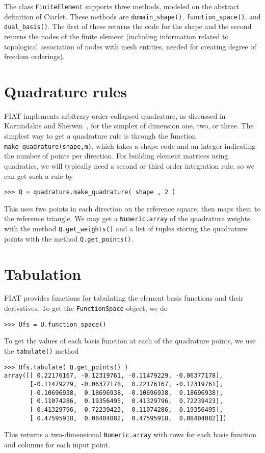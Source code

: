 \documentclass{fenicsmanual}
\begin{document}
The class \verb.FiniteElement. supports three methods, modeled on the
abstract definition of Ciarlet.  These methods are
\verb.domain_shape()., \verb.function_space()., and \verb.dual_basis()..
The first of these returns the code for the shape and the second
returns the nodes of the finite element (including information related
to topological association of nodes with mesh entities, needed for
creating degree of freedom orderings).  

\section{Quadrature rules}
FIAT implements arbitrary-order collapsed quadrature, as discussed in
Karniadakis and Sherwin~\cite{}, for the simplex of dimension one,
two, or three.  The simplest way to get a quadrature rule is through
the function \verb.make_quadrature(shape,m)., which takes a shape code
and an integer indicating the number of points per direction.  For
building element matrices using quadratics, we will typically need a
second or third order integration rule, so we can get such a rule by
\begin{verbatim}
>>> Q = quadrature.make_quadrature( shape , 2 )
\end{verbatim}
This uses two points in each direction on the reference square, then
maps them to the reference triangle.  We may get a
\verb/Numeric.array/ of the quadrature weights with the method
\verb/Q.get_weights()/ and a list of tuples storing the quadrature
points with the method \verb/Q.get_points()/.

\section{Tabulation}
FIAT provides functions for tabulating the element basis functions and
their derivatives.  To get the \verb.FunctionSpace. object, we do
\begin{verbatim}
>>> Ufs = U.function_space()
\end{verbatim}
To get the values of each basis function at each of the quadrature
points, we use the \verb.tabulate(). method
\begin{verbatim}
>>> Ufs.tabulate( Q.get_points() )
array([[ 0.22176167, -0.12319761, -0.11479229, -0.06377178],
       [-0.11479229, -0.06377178,  0.22176167, -0.12319761],
       [-0.10696938,  0.18696938, -0.10696938,  0.18696938],
       [ 0.11074286,  0.19356495,  0.41329796,  0.72239423],
       [ 0.41329796,  0.72239423,  0.11074286,  0.19356495],
       [ 0.47595918,  0.08404082,  0.47595918,  0.08404082]])
\end{verbatim}
This returns a two-dimensional \verb/Numeric.array/ with rows for each
basis function and columns for each input point.
\end{document}
